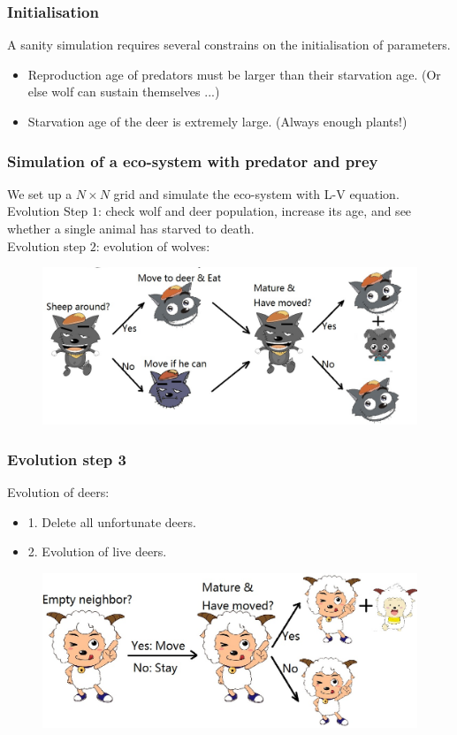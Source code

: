 \documentclass{beamer}
\begin{document}
\frame
{
  \frametitle{Initialisation}
  A sanity simulation requires several constrains on the initialisation of parameters.
  \begin{itemize}
  \item<1->{Reproduction age of predators must be larger than their starvation age. (Or else wolf can sustain themselves ...)}
  \item<2->{Starvation age of the deer is extremely large. (Always enough plants!)}
  \end{itemize} 
}

\frame
{
  \frametitle{Simulation of a eco-system with predator and prey}
  We set up a $N \times N$ grid and simulate the eco-system with L-V equation. \\
  Evolution Step $1$: check wolf and deer population, increase its age, and see whether a single animal has starved to death. \\
  Evolution step $2$: evolution of wolves: \\
  \begin{figure}[htb]
  \begin{center}
  \includegraphics[width=\textwidth]{./pics/wolf.jpeg}
  \label{default}
  \end{center}
  \end{figure}
}

\frame
{
  \frametitle{Evolution step 3}
  Evolution of deers: \\
  \begin{itemize}
  \item 1. Delete all unfortunate deers. \\
  \pause
  \item 2. Evolution of live deers. \\
  \end{itemize}
  \begin{figure}[htbp]
  \begin{center}
  \includegraphics[width=\textwidth]{./pics/goat.jpeg}
  \label{default}
  \end{center}
  \end{figure}
}
\end{document}
